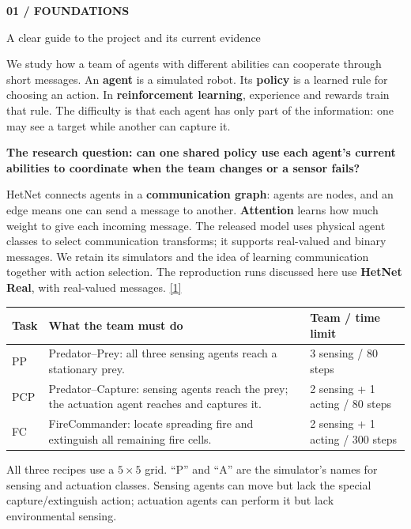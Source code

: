 \documentclass[11pt,letterpaper]{article}
\newcommand{\eyebrow}[1]{{\small\bfseries\color{teal}#1}\par\vspace{3pt}}
\newcommand{\pagetitle}[2]{\eyebrow{#1}{\fontsize{25}{28}\selectfont\bfseries #2\par}\vspace{7pt}}
\newcommand{\sub}[1]{\par\vspace{5pt}{\large\bfseries #1}\par\vspace{1pt}}
\newcommand{\takeaway}[1]{\par\vspace{5pt}\noindent\colorbox{pale}{\parbox{\dimexpr\linewidth-18pt\relax}{\vspace{5pt}\textbf{#1}\vspace{5pt}}}\par\vspace{3pt}}
\newcommand{\refnum}[2]{\href{#2}{[#1]}}
\begin{document}
\pagetitle{01 / FOUNDATIONS}{Capability-Conditioned HetNet}
{\large A clear guide to the project and its current evidence}

We study how a team of agents with different abilities can cooperate through short messages. An \textbf{agent} is a simulated robot. Its \textbf{policy} is a learned rule for choosing an action. In \textbf{reinforcement learning}, experience and rewards train that rule. The difficulty is that each agent has only part of the information: one may see a target while another can capture it.

\takeaway{The research question: can one shared policy use each agent's current abilities to coordinate when the team changes or a sensor fails?}

\sub{The starting point: HetNet}
HetNet connects agents in a \textbf{communication graph}: agents are nodes, and an edge means one can send a message to another. \textbf{Attention} learns how much weight to give each incoming message. The released model uses physical agent classes to select communication transforms; it supports real-valued and binary messages. We retain its simulators and the idea of learning communication together with action selection. The reproduction runs discussed here use \textbf{HetNet Real}, with real-valued messages. \refnum{1}{https://ifaamas.org/Proceedings/aamas2022/pdfs/p1173.pdf}

\sub{The environments, in everyday terms}
{\small\renewcommand{\arraystretch}{1.2}\begin{tabularx}{\linewidth}{@{}p{.65in}Xp{1.18in}@{}}\toprule
Task & What the team must do & Team / time limit \\\midrule
PP & Predator--Prey: all three sensing agents reach a stationary prey. & 3 sensing / 80 steps \\
PCP & Predator--Capture: sensing agents reach the prey; the actuation agent reaches and captures it. & 2 sensing + 1 acting / 80 steps \\
FC & FireCommander: locate spreading fire and extinguish all remaining fire cells. & 2 sensing + 1 acting / 300 steps \\\bottomrule
\end{tabularx}}\par\vspace{3pt}
All three recipes use a $5\times5$ grid. ``P'' and ``A'' are the simulator's names for sensing and actuation classes. Sensing agents can move but lack the special capture/extinguish action; actuation agents can perform it but lack environmental sensing.
\end{document}
